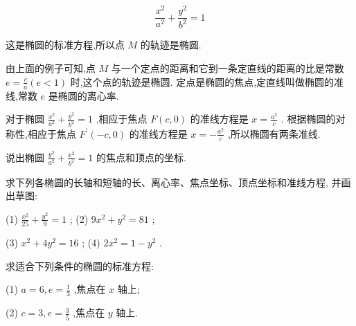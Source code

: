 \documentclass[lang=cn,newtx,10pt,scheme=chinese]{elegantbook}
\begin{document}
\[
  \frac{{x}^{2}}{{a}^{2}} + \frac{{y}^{2}}{{b}^{2}} = 1
\]

这是椭圆的标准方程,所以点 \(M\) 的轨迹是椭圆.

由上面的例子可知,点 \(M\) 与一个定点的距离和它到一条定直线的距离的比是常数 \(e = \frac{c}{a}\left( {e < 1}\right)\) 时,这个点的轨迹是椭圆. 定点是椭圆的焦点,定直线叫做椭圆的准线,常数 \(e\) 是椭圆的离心率.

对于椭圆 \(\frac{{x}^{2}}{{a}^{2}} + \frac{{y}^{2}}{{b}^{2}} = 1\) ,相应于焦点 \(F\left( {c,0}\right)\) 的准线方程是 \(x = \frac{{a}^{2}}{c}\) . 根据椭圆的对称性,相应于焦点 \({F}^{\prime }\left( {-c,0}\right)\) 的准线方程是 \(x = - \frac{{a}^{2}}{c}\) ,所以椭圆有两条准线.

\begin{problemset}[练习]

\item 说出椭圆 \(\frac{{y}^{2}}{{a}^{2}} + \frac{{x}^{2}}{{b}^{2}} = 1\) 的焦点和顶点的坐标.

\item 求下列各椭圆的长轴和短轴的长、离心率、焦点坐标、顶点坐标和准线方程, 并画出草图:

(1) \(\frac{{x}^{2}}{25} + \frac{{y}^{2}}{9} = 1\) ; (2) \(9{x}^{2} + {y}^{2} = {81}\) ;

(3) \({x}^{2} + 4{y}^{2} = {16}\) ; (4) \(2{x}^{2} = 1 - {y}^{2}\) .

\item 求适合下列条件的椭圆的标准方程:

(1) \(a = 6,e = \frac{1}{3}\) ,焦点在 \(x\) 轴上;

(2) \(c = 3,e = \frac{3}{5}\) ,焦点在 \(y\) 轴上.

\end{problemset}
\end{document}
